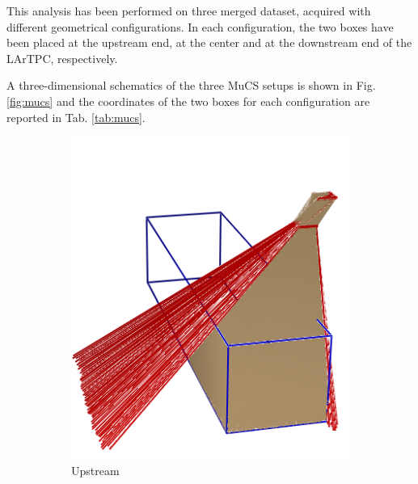 \documentclass[a4paper]{scrartcl}
\begin{document}
This analysis has been performed on three merged dataset, acquired with different geometrical configurations. In each configuration, the two boxes have been placed at the upstream end, at the center and at the downstream end of the LArTPC, respectively.

A three-dimensional schematics of the three MuCS setups is shown in Fig. \ref{fig:mucs} and the coordinates of the two boxes for each configuration are reported in Tab. \ref{tab:mucs}.
\begin{figure}[htbp]
  \begin{subfigure}{0.30\textwidth}
    \includegraphics[width=\linewidth]{figures/upstream.png}
    \caption{Upstream} \label{fig:upstream}
  \end{subfigure}
  \begin{subfigure}{0.30\textwidth}

\end{subfigure}
\end{figure}
\end{document}
